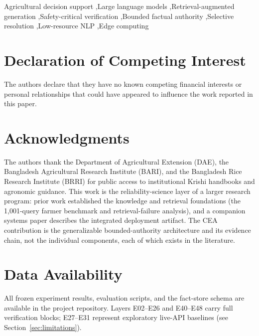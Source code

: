 \documentclass[a4paper,fleqn]{cas-dc}
\begin{document}
\begin{keywords}
Agricultural decision support \sep Large language models \sep Retrieval-augmented generation \sep Safety-critical verification \sep Bounded factual authority \sep Selective resolution \sep Low-resource NLP \sep Edge computing
\end{keywords}

\maketitle
















\section*{Declaration of Competing Interest}
The authors declare that they have no known competing financial interests or personal relationships that could have appeared to influence the work reported in this paper.

\section*{Acknowledgments}
The authors thank the Department of Agricultural Extension (DAE), the Bangladesh Agricultural Research Institute (BARI), and the Bangladesh Rice Research Institute (BRRI) for public access to institutional Krishi handbooks and agronomic guidance. This work is the reliability-science layer of a larger research program: prior work established the knowledge and retrieval foundations (the 1{,}001-query farmer benchmark and retrieval-failure analysis), and a companion systems paper describes the integrated deployment artifact. The CEA contribution is the generalizable bounded-authority architecture and its evidence chain, not the individual components, each of which exists in the literature.

\section*{Data Availability}
All frozen experiment results, evaluation scripts, and the fact-store schema are available in the project repository. Layers E02--E26 and E40--E48 carry full verification blocks; E27--E31 represent exploratory live-API baselines (see Section~\ref{sec:limitations}).



\end{document}
